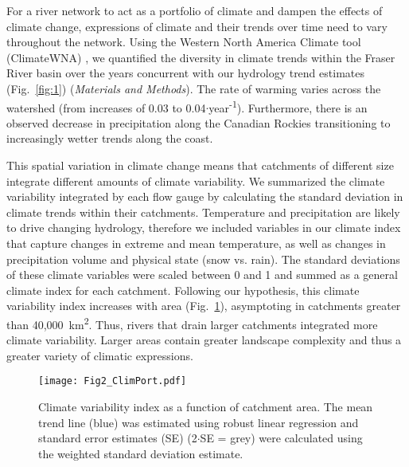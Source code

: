 \documentclass[9pt,twocolumn,twoside,lineno]{pnas-new}
\begin{document}
For a river network to act as a portfolio of climate and dampen the effects of climate change, expressions of climate and their trends over time need to vary throughout the network. Using the Western North America Climate tool (ClimateWNA) \cite{Wang:2016}, we quantified the diversity in climate trends within the Fraser River basin over the years concurrent with our hydrology trend estimates (Fig.~\ref{fig:1}) (\textit{Materials and Methods}). The rate of warming varies across the watershed (from increases of 0.03 to 0.04\celsius$\cdot$year\textsuperscript{-1}). Furthermore, there is an observed decrease in precipitation along the Canadian Rockies transitioning to increasingly wetter trends along the coast.

This spatial variation in climate change means that catchments of different size integrate different amounts of climate variability. We summarized the climate variability integrated by each flow gauge by calculating the standard deviation in climate trends within their catchments. Temperature and precipitation are likely to drive changing hydrology, therefore we included variables in our climate index that capture changes in extreme and mean temperature, as well as changes in precipitation volume and physical state (snow vs. rain). The standard deviations of these climate variables were scaled between 0 and 1 and summed as a general climate index for each catchment. Following our hypothesis, this climate variability index increases with area (Fig.~\ref{fig:2}), asymptoting in catchments greater than 40,000~km\textsuperscript{2}. Thus, rivers that drain larger catchments integrated more climate variability. Larger areas contain greater landscape complexity and thus a greater variety of climatic expressions.

\begin{figure}[h]
\centering
\texttt{[image: Fig2\_ClimPort.pdf]}
	\caption{Climate variability index as a function of catchment area. The mean trend line (blue) was estimated using robust linear regression and standard error estimates (SE) (2$\cdot$SE = grey) were calculated using the weighted standard deviation estimate.}
\label{fig:2}
\end{figure}
\end{document}

